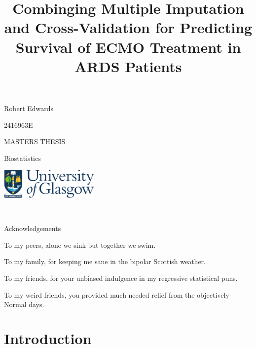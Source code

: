 \documentclass[12pt,]{article}
\title{Combinging Multiple Imputation and Cross-Validation for Predicting
Survival of ECMO Treatment in ARDS Patients}
\author{}
\date{}
\begin{document}
\maketitle

\vspace{4cm}

\begin{center}
Robert Edwards 

\vspace{0.125cm}
2416963E


\vspace{1cm}
MASTERS THESIS 

\vspace{0.125cm}
Biostatistics

\vspace{9cm}
  \includegraphics[height = 1.5cm]{images/GUlogo.png}
\end{center}

\newpage

\begin{center}
~
 
\vspace{5cm}
Acknowledgements 

\vspace{3cm}
To my peers, alone we sink but together we swim.

\vspace{1cm}
To my family, for keeping me sane in the bipolar Scottish weather. 

\vspace{1cm}
To my friends, for your unbiased indulgence in my regressive statistical puns. 

\vspace{1cm}
To my weird friends, you provided much needed relief from the objectively Normal days. 

\end{center}

\newpage 

\setcounter{tocdepth}{2} \tableofcontents  

\newpage

\section{Introduction}\label{introduction}
\end{document}
